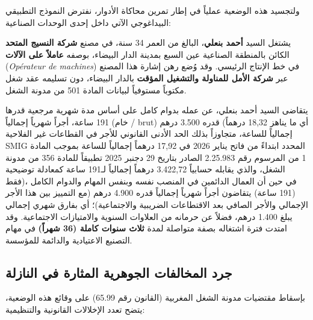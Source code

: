 ولتجسيد هذه الوضعية عملياً في إطار تمرين محاكاة الأدوار، نفترض النموذج التطبيقي البيداغوجي الآتي داخل إحدى الوحدات الصناعية:

\begin{tcolorbox}[colback=lightgray, colframe=maincolor, arc=4pt,
    title={\textbf{النموذج التطبيقي للوضعية المهنية (المجموعة \textenglish{8})}}]
يشتغل السيد \textbf{أحمد بنعلي}، البالغ من العمر \textenglish{34} سنة، في مصنع \textbf{شركة النسيج المتحد} الكائن بالمنطقة الصناعية عين السبع بمدينة الدار البيضاء، بوصفه \textbf{عاملاً على الآلات} (\textenglish{\textit{Opérateur de machines}}) في خط الإنتاج الرئيسي. وقد وُضع رهن إشارة هذا المصنع عبر \textbf{شركة الأمل للمناولة والتشغيل المؤقت} بالدار البيضاء، دون تسليمه عقد شغل مكتوباً مستوفياً لبيانات المادة \textenglish{501} من مدونة الشغل.

يتقاضى السيد أحمد بنعلي، عن عمله بدوام كامل على أساس مدة شهرية مرجعية قدرها \textenglish{191} ساعة، أجراً شهرياً إجمالياً (خام / \textenglish{brut}) قدره \textenglish{3.500} درهم (أي ما يناهز \textenglish{18,32} درهماً إجمالياً للساعة، متجاوزاً بذلك الحد الأدنى القانوني للأجر في القطاعات غير الفلاحية \textenglish{SMIG} المحدد ابتداءً من فاتح يناير \textenglish{2026} في \textenglish{17,92} درهماً إجمالياً للساعة بموجب المادة \textenglish{1} من المرسوم رقم \textenglish{2.25.983} الصادر بتاريخ \textenglish{29} دجنبر \textenglish{2025} تطبيقاً للمادة \textenglish{356} من مدونة الشغل، والذي يقابله حسابياً \textenglish{3.422,72} درهماً إجمالياً لـ\textenglish{191} ساعة كمعادلة توضيحية فقط)، في حين أن العمال الدائمين في المنصب نفسه وبنفس المهام والدوام الكامل (\textenglish{191} ساعة) يتقاضون أجراً شهرياً إجمالياً قدره \textenglish{4.900} درهم (مع التمييز بين هذا الأجر الإجمالي والأجر الصافي بعد الاقتطاعات الضريبية والاجتماعية)؛ أي بفارق شهري إجمالي يبلغ \textenglish{1.400} درهم، فضلاً عن حرمانه من العلاوات السنوية والامتيازات الاجتماعية. وقد امتدت فترة اشتغاله بصفة متواصلة لمدة \textbf{ثلاث سنوات كاملة (\textenglish{36} شهراً)} في مهام التصنيع الاعتيادية والدائمة للمؤسسة.
\end{tcolorbox}

\subsection{جرد المخالفات الجوهرية المثارة في النازلة}
بإسقاط مقتضيات مدونة الشغل المغربية (القانون رقم \textenglish{65.99}) على وقائع هذه الوضعية، يتضح تعدد الإخلالات القانونية والتنظيمية:

